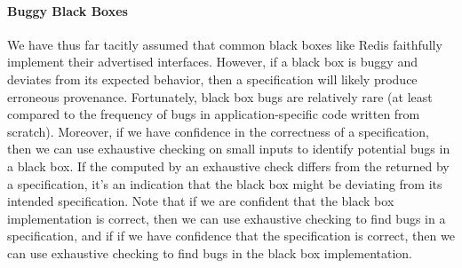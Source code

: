 \paragraph{Buggy Black Boxes}
We have thus far tacitly assumed that common black boxes like Redis faithfully
implement their advertised interfaces. However, if a black box is buggy and
deviates from its expected behavior, then a \watprovenance{} specification will
likely produce erroneous provenance. Fortunately, black box bugs are relatively
rare (at least compared to the frequency of bugs in application-specific code
written from scratch).
%
Moreover, if we have confidence in the correctness of a \watprovenance{}
specification, then we can use exhaustive \watprovenance{} checking on small
inputs to identify potential bugs in a black box.  If the \watprovenance{}
computed by an exhaustive \watprovenance{} check differs from the
\watprovenance{} returned by a specification, it's an indication that the black
box might be deviating from its intended specification. Note that if we are
confident that the black box implementation is correct, then we can use
exhaustive \watprovenance{} checking to find bugs in a \watprovenance{}
specification, and if if we have confidence that the \watprovenance{}
specification is correct, then we can use exhaustive \watprovenance{} checking
to find bugs in the black box implementation.
